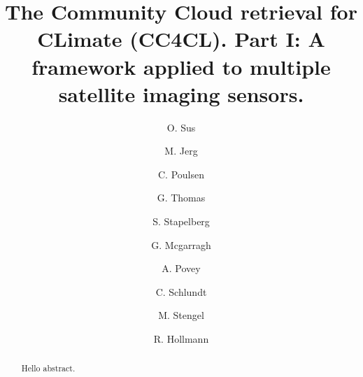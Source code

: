 \documentclass[amt]{copernicus}
\begin{document}
\linenumbers

\title{The Community Cloud retrieval for CLimate (CC4CL). Part I: A
  framework applied to multiple satellite imaging sensors.}

\author[1]{O. Sus}
\author[1]{M. Jerg}
\author[2]{C. Poulsen}
\author[2]{G. Thomas}
\author[1]{S. Stapelberg}
\author[3]{G. Mcgarragh}
\author[3]{A. Povey}
\author[1]{C. Schlundt}
\author[1]{M. Stengel}
\author[1]{R. Hollmann}





\received{}
\pubdiscuss{} %
\revised{}
\accepted{}
\published{}


\maketitle

\begin{abstract}
  Hello abstract.
\end{abstract}













\appendix
\end{document}
